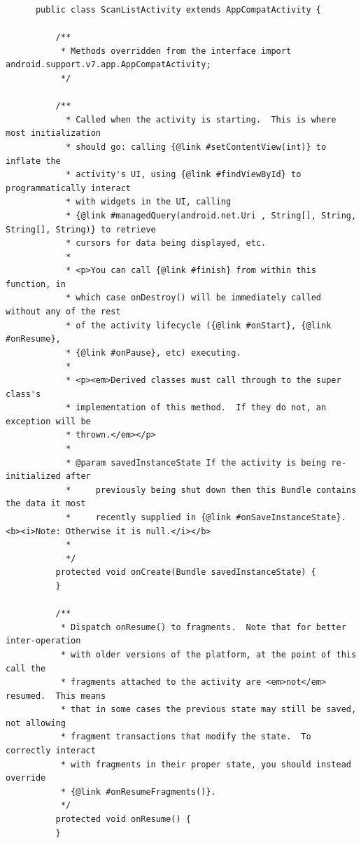     \begin{lstlisting}
      public class ScanListActivity extends AppCompatActivity {

          /**
           * Methods overridden from the interface import android.support.v7.app.AppCompatActivity;
           */

          /**
            * Called when the activity is starting.  This is where most initialization
            * should go: calling {@link #setContentView(int)} to inflate the
            * activity's UI, using {@link #findViewById} to programmatically interact
            * with widgets in the UI, calling
            * {@link #managedQuery(android.net.Uri , String[], String, String[], String)} to retrieve
            * cursors for data being displayed, etc.
            *
            * <p>You can call {@link #finish} from within this function, in
            * which case onDestroy() will be immediately called without any of the rest
            * of the activity lifecycle ({@link #onStart}, {@link #onResume},
            * {@link #onPause}, etc) executing.
            *
            * <p><em>Derived classes must call through to the super class's
            * implementation of this method.  If they do not, an exception will be
            * thrown.</em></p>
            *
            * @param savedInstanceState If the activity is being re-initialized after
            *     previously being shut down then this Bundle contains the data it most
            *     recently supplied in {@link #onSaveInstanceState}.  <b><i>Note: Otherwise it is null.</i></b>
            *
            */
          protected void onCreate(Bundle savedInstanceState) {
          }

          /**
           * Dispatch onResume() to fragments.  Note that for better inter-operation
           * with older versions of the platform, at the point of this call the
           * fragments attached to the activity are <em>not</em> resumed.  This means
           * that in some cases the previous state may still be saved, not allowing
           * fragment transactions that modify the state.  To correctly interact
           * with fragments in their proper state, you should instead override
           * {@link #onResumeFragments()}.
           */
          protected void onResume() {
          }


\end{lstlisting}
